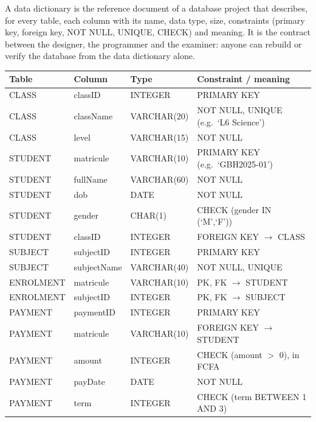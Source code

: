 \documentclass[11pt]{article}
\newcommand{\cle}[1]{{\popxbold\color{popdark}#1}}
\begin{document}
\begin{definition}
A \cle{data dictionary} is the reference document of a database project that describes, for every table, each column with its name, data type, size, constraints (primary key, foreign key, NOT NULL, UNIQUE, CHECK) and meaning. It is the contract between the designer, the programmer and the examiner: anyone can rebuild or verify the database from the data dictionary alone.
\end{definition}

\begin{center}
\begin{tabularx}{\linewidth}{|l|l|l|X|}
\hline
\rowcolor{popblueL} \textbf{Table} & \textbf{Column} & \textbf{Type} & \textbf{Constraint / meaning} \\
\hline
CLASS & classID & INTEGER & PRIMARY KEY \\
\hline
CLASS & className & VARCHAR(20) & NOT NULL, UNIQUE (e.g.\ `L6 Science') \\
\hline
CLASS & level & VARCHAR(15) & NOT NULL \\
\hline
STUDENT & matricule & VARCHAR(10) & PRIMARY KEY (e.g.\ `GBH2025-01') \\
\hline
STUDENT & fullName & VARCHAR(60) & NOT NULL \\
\hline
STUDENT & dob & DATE & NOT NULL \\
\hline
STUDENT & gender & CHAR(1) & CHECK (gender IN (`M',`F')) \\
\hline
STUDENT & classID & INTEGER & FOREIGN KEY $\to$ CLASS \\
\hline
SUBJECT & subjectID & INTEGER & PRIMARY KEY \\
\hline
SUBJECT & subjectName & VARCHAR(40) & NOT NULL, UNIQUE \\
\hline
ENROLMENT & matricule & VARCHAR(10) & PK, FK $\to$ STUDENT \\
\hline
ENROLMENT & subjectID & INTEGER & PK, FK $\to$ SUBJECT \\
\hline
PAYMENT & paymentID & INTEGER & PRIMARY KEY \\
\hline
PAYMENT & matricule & VARCHAR(10) & FOREIGN KEY $\to$ STUDENT \\
\hline
PAYMENT & amount & INTEGER & CHECK (amount $>$ 0), in FCFA \\
\hline
PAYMENT & payDate & DATE & NOT NULL \\
\hline
PAYMENT & term & INTEGER & CHECK (term BETWEEN 1 AND 3) \\
\hline
\end{tabularx}
\end{center}
\end{document}
